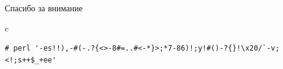 \documentclass[hyperref={unicode=true}]{beamer}
\begin{document}
\usebackgroundtemplate{}
\begin{frame}[fragile]
   \vspace{3em}
   \centering \LARGE Спасибо за внимание

   \vspace{4em}
   \begin{tabular}{c}
      \begin{lstlisting}[basicstyle=\tiny]
      # perl '-es!!),-#(-.?{<>-8#=..#<-*}>;*7-86)!;y!#()-?{}!\x20/`-v;<!;s++$_+ee'
      \end{lstlisting} 
   \end{tabular}
\end{frame}
\end{document}

